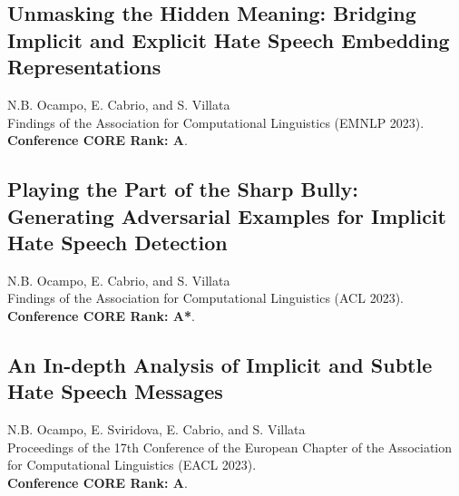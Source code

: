 \documentclass[a4paper]{MagicalCV}
\begin{document}
\begin{minipage}[t]{1\textwidth} 

\subsection{Unmasking the Hidden Meaning: Bridging Implicit and Explicit Hate Speech Embedding Representations}
N.B. Ocampo, E. Cabrio, and S. Villata \\
\href{https://aclanthology.org/2023.findings-emnlp.441/}{\faLink} Findings of the Association for Computational Linguistics (EMNLP 2023). \\ \textbf{Conference CORE Rank: A}.
\sectionsep

\subsection{Playing the Part of the Sharp Bully: Generating Adversarial Examples for Implicit Hate Speech Detection}
N.B. Ocampo, E. Cabrio, and S. Villata \\
\href{https://aclanthology.org/2023.findings-acl.173}{\faLink} Findings of the Association for Computational Linguistics (ACL 2023). \\ \textbf{Conference CORE Rank: A*}.
\sectionsep

\subsection{An In-depth Analysis of Implicit and Subtle Hate Speech Messages}
N.B. Ocampo, E. Sviridova, E. Cabrio, and S. Villata \\
\href{https://aclanthology.org/2023.eacl-main.147}{\faLink} Proceedings of the 17th Conference of the European Chapter of the Association for Computational Linguistics (EACL 2023). \\ \textbf{Conference CORE Rank: A}.

\end{minipage}
\end{document}
